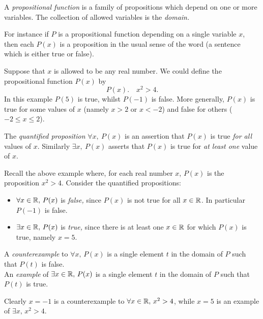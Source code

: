 \begin{defn}{}{}
A \emph{propositional function} is a family of propositions which depend on one or more variables. The collection of allowed variables is the \emph{domain.}
\end{defn}

 For instance if $P$ is a propositional function depending on a single variable $x$, then each $P(x)$ is a proposition in the usual sense of the word (a sentence which is either true or false).

\begin{example}{}{}
Suppose that $x$ is allowed to be any real number. We could define the propositional function $P(x)$ by
\[P(x).\quad x^2>4.\]
In this example $P(5)$ is true, whilst $P(-1)$ is false. More generally, $P(x)$ is true for some values of $x$ (namely $x>2$ or $x<-2$) and false for others ($-2\le x\le 2$).
\end{example}

\begin{defn}{}{}
The \emph{quantified proposition} $\forall x,\ P(x)$ is an assertion that $P(x)$ is true \emph{for all} values of $x$. Similarly $\exists x,\ P(x)$ asserts that $P(x)$ is true for \emph{at least one} value of $x$.
\end{defn}

\begin{example}{}{}
Recall the above example where, for each real number $x$, $P(x)$ is the proposition $x^2>4$. Consider the quantified propositions:
\begin{itemize}
  \item $\forall x\in\mathbb{R},\, P(x)$ is \emph{false,} since $P(x)$ is not true for all $x\in\mathbb{R}$. In particular $P(-1)$ is false.
  \item $\exists x\in\mathbb{R},\, P(x)$ is \emph{true,} since there is at least one $x\in\mathbb{R}$ for which $P(x)$ is true, namely $x=5$.
\end{itemize}
\end{example}

\begin{defn}{}{}
A \emph{counterexample} to $\forall x,\, P(x)$ is a single element $t$ in the domain of $P$ such that $P(t)$ is false.\\
An \emph{example} of $\exists x\in\mathbb{R},\, P(x)$ is a single element $t$ in the domain of $P$ such that $P(t)$ is true.
\end{defn}

 Clearly $x=-1$ is a counterexample to $\forall x\in\mathbb{R},\,x^2>4$, while $x=5$ is an example of $\exists x,\,x^2>4$.

